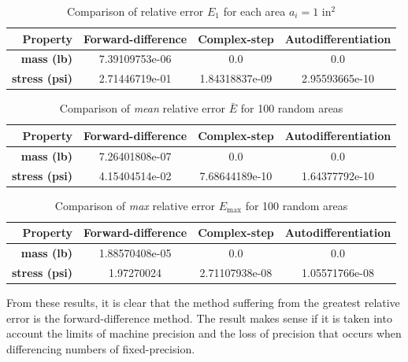 \documentclass{article}
\begin{document}

\begin{table}[htb]
	\centering
	\caption{Comparison of relative error $E_{1}$ for each area $a_i = 1\text{ in}^2$}\label{tab:ones}
	\begin{tabular}{r c c c}
		\toprule
		\textbf{Property} & Forward-difference & Complex-step & Autodifferentiation \\
		\midrule
		\textbf{mass (lb)} & 7.39109753e-06 & 0.0\footnotemark[1] & 0.0\footnotemark[1] \\
		\textbf{stress (psi)} & 2.71446719e-01 & 1.84318837e-09 & 2.95593665e-10 \\
		\bottomrule
	\end{tabular}
\end{table}


\begin{table}[htb]
	\centering
	\caption{Comparison of \textit{mean} relative error $\bar{E}$ for 100 random areas}\label{tab:mean}
	\begin{tabular}{r c c c}
		\toprule
		\textbf{Property} & Forward-difference & Complex-step & Autodifferentiation \\
		\midrule
		\textbf{mass (lb)} & 7.26401808e-07 & 0.0\footnotemark[1] & 0.0\footnotemark[1] \\
		\textbf{stress (psi)} & 4.15404514e-02 & 7.68644189e-10 & 1.64377792e-10 \\
		\bottomrule
	\end{tabular}
\end{table}


\begin{table}[htb]
	\centering
	\caption{Comparison of \textit{max} relative error $E_{\max}$ for 100 random areas}\label{tab:max}
	\begin{tabular}{r c c c}
		\toprule
		\textbf{Property} & Forward-difference & Complex-step & Autodifferentiation \\
		\midrule
		\textbf{mass (lb)} & 1.88570408e-05 & 0.0\footnotemark[1] & 0.0\footnotemark[1] \\
		\textbf{stress (psi)} & 1.97270024 & 2.71107938e-08 & 1.05571766e-08 \\
		\bottomrule
	\end{tabular}
\end{table}

From these results, it is clear that the method suffering from the greatest relative error is the forward-difference method. The result makes sense if it is taken into account the limits of machine precision and the loss of precision that occurs when differencing numbers of fixed-precision.
\end{document}
